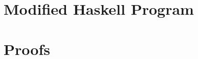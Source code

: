 \documentclass{llncs}
\begin{document}
%
%
\nocite{*}




\newpage
\appendix
\section{Modified Haskell Program}

\label{appendix:app}

\section{Proofs}
\label{appendix:proofs}


%
\end{document}
